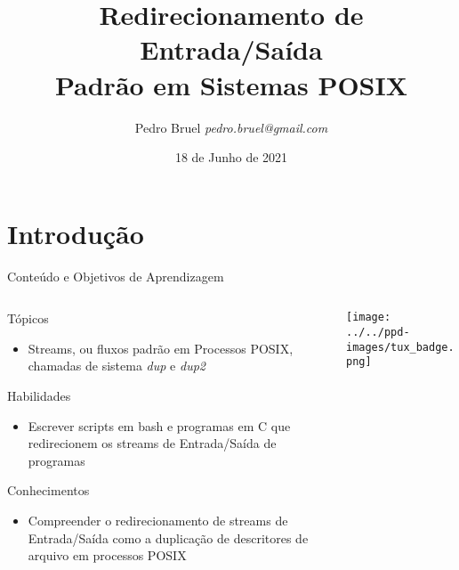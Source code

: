 \documentclass[10pt, compress, aspectratio=169, xcolor={table,usenames,dvipsnames}]{beamer}
\author{\footnotesize Pedro Bruel \newline \scriptsize \emph{pedro.bruel@gmail.com}}
\date{\scriptsize 18 de Junho de 2021}
\title{ Redirecionamento de Entrada/Saída \\
Padrão em Sistemas POSIX}
\begin{document}
\maketitle

\section{Introdução}
\label{sec:org2b10b55}
\begin{frame}[label={sec:org4ac696b}]{Conteúdo e Objetivos de Aprendizagem}
\begin{columns}
\begin{column}{0.65\columnwidth}
\begin{block}{Tópicos}
\begin{itemize}
\item \alert{Streams}, ou \alert{fluxos} padrão em Processos POSIX,
chamadas de sistema \emph{\alert{dup}} e \emph{\alert{dup2}}
\end{itemize}

\begin{block}{Habilidades}
\begin{itemize}
\item Escrever scripts em \alert{bash} e programas  em \alert{C} que \alert{redirecionem} os \alert{streams}
de \alert{Entrada/Saída} de programas
\end{itemize}
\end{block}

\begin{block}{Conhecimentos}
\begin{itemize}
\item Compreender o redirecionamento de streams  de Entrada/Saída como a \alert{duplicação
de descritores de arquivo} em processos POSIX
\end{itemize}
\end{block}
\end{block}
\end{column}

\begin{column}{0.35\columnwidth}
\begin{center}
\texttt{[image: ../../ppd-images/tux\_badge.png]}
\end{center}
\end{column}
\end{columns}
\end{frame}
\end{document}
